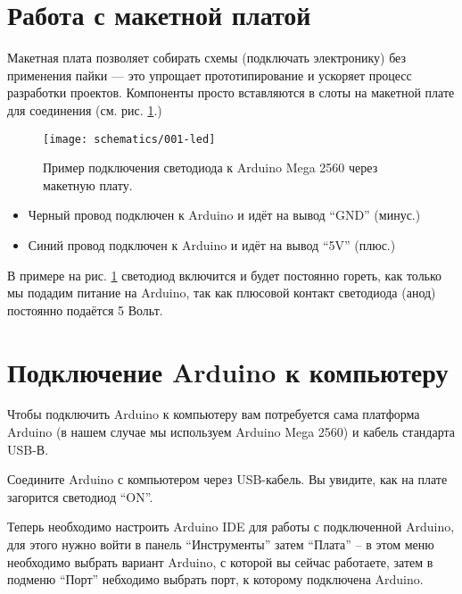 \documentclass[../sparc.tex]{subfiles}
\begin{document}
\section{Работа с макетной платой}

Макетная плата позволяет собирать схемы (подключать электронику) без применения
пайки --- это упрощает прототипирование и ускоряет процесс разработки проектов.
Компоненты просто вставляются в слоты на макетной плате для соединения
(см. рис. \ref{fig:breadboard-led}.)

\begin{figure}[ht]
  \centering
  \texttt{[image: schematics/001-led]}
  \caption{Пример подключения светодиода к Arduino Mega 2560 через макетную
    плату.}
  \label{fig:breadboard-led}
\end{figure}

\begin{itemize}
\item Черный провод подключен к Arduino и идёт на вывод ``GND'' (минус.)
\item Синий провод подключен к Arduino и идёт на вывод ``5V'' (плюс.)
\end{itemize}


В примере на рис. \ref{fig:breadboard-led} светодиод включится и будет постоянно
гореть, как только мы подадим питание на Arduino, так как плюсовой контакт
светодиода (анод) постоянно подаётся 5 Вольт.

\section{Подключение Arduino к компьютеру}
Чтобы подключить Arduino к компьютеру вам потребуется сама платформа Ardu\-ino
(в нашем случае мы используем Arduino Mega 2560) и кабель стандарта USB-В.

Соедините Arduino с компьютером через USB-кабель. Вы увидите, как на плате
загорится светодиод ``ON''.

Теперь необходимо настроить Arduino IDE для работы с подключенной Ardu\-ino, для
этого нужно войти в панель ``Инструменты'' затем ``Плата'' -- в этом меню
необходимо выбрать вариант Arduino, с которой вы сейчас работаете, затем в
подменю ``Порт'' небходимо выбрать порт, к которому подключена Arduino.


\end{document}
